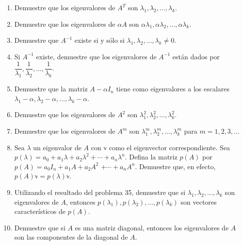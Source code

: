 \begin{enumerate}[resume]
    \item Demuestre que los eigenvalores de $A^{T}$ son $\lambda_{1}, \lambda_{2}, \dots, \lambda_{k}$.\newpage
    \item Demuestre que los eigenvalores de $\alpha A$ son $\alpha \lambda_{1}, \alpha \lambda_{2}, \dots, \alpha \lambda_{k}$.
    \item Demuestre que $A^{-1}$ existe si y sólo si $\lambda_{1}, \lambda_{2}, \dots, \lambda_{k} \neq 0$.
    \item Si $A^{-1}$ existe, demuestre que los eigenvalores de $A^{-1}$ están dados por $\dfrac{1}{\lambda_{1}}, \dfrac{1}{\lambda_{2}}, \dots, \dfrac{1}{\lambda_{k}}$.
    \item Demuestre que la matriz $A-\alpha I_n$ tiene como eigenvalores a los escalares $\lambda_{1}-\alpha, \lambda_{2}-\alpha, \dots, \lambda_{k}-\alpha$.
    \item Demuestre que los eigenvalores de $A^{2}$ son $\lambda_{1}^{2}, \lambda_{2}^{2}, \dots, \lambda_{k}^{2}$.
    \item Demuestre que los eigenvalores de $A^{m}$ son $\lambda_{1}^{m}, \lambda_{2}^{m}, \dots, \lambda_{k}^{m}$ para $m=1,2,3, \dots$
    \item Sea $\lambda$ un eigenvalor de $A$ con $\mathbb{v}$ como el eigenvector correspondiente. Sea $p(\lambda)=a_{0}+a_{1} \lambda+a_{2} \lambda^{2}+\cdots+a_{n} \lambda^{n}$. Defina la matriz $p(A)$ por $p(A)=a_{0} I_n+a_{1} A+a_{2} A^{2}$ $+\cdots+a_{n} A^{n}$. Demuestre que, en efecto, $p(A) \mathbb{v}=p(\lambda) \mathbb{v}$.
    \item Utilizando el resultado del problema 35, demuestre que si $\lambda_{1}, \lambda_{2}, \dots, \lambda_{k}$ son eigenvalores de $A$, entonces $p\left(\lambda_{1}\right), p\left(\lambda_{2}\right), \dots, p\left(\lambda_{k}\right)$ son vectores característicos de $p(A)$.
    \item Demuestre que si $A$ es una matriz diagonal, entonces los eigenvalores de $A$ son las componentes de la diagonal de $A$.

\end{enumerate}
